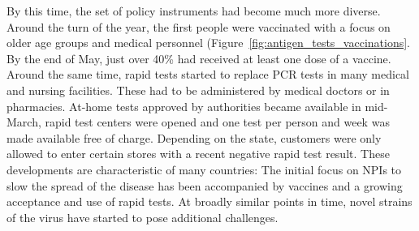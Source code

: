By this time, the set of policy instruments had become much more diverse. Around the
turn of the year, the first people were vaccinated with a focus on older age groups and
medical personnel (Figure~\ref{fig:antigen_tests_vaccinations}. By the end of May, just
over 40\% had received at least one dose of a vaccine. Around the same time, rapid tests
started to replace PCR tests in many medical and nursing facilities. These had to be
administered by medical doctors or in pharmacies. At-home tests approved by authorities
became available in mid-March, rapid test centers were opened and one test per person
and week was made available free of charge. Depending on the state, customers were only
allowed to enter certain stores with a recent negative rapid test result. These
developments are characteristic of many countries: The initial focus on NPIs to slow the
spread of the disease has been accompanied by vaccines and a growing acceptance and use
of rapid tests. At broadly similar points in time, novel strains of the virus have
started to pose additional challenges. 

